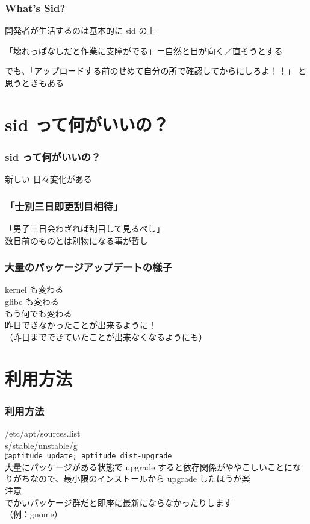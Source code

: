 \documentclass[cjk,dvipdfmx]{beamer}
\begin{document}
 \begin{frame}
  \frametitle{ What's Sid?}
 
 開発者が生活するのは基本的に sid の上
  
  「壊れっぱなしだと作業に支障がでる」＝自然と目が向く／直そうとする

 でも、「アップロードする前のせめて自分の所で確認してからにしろよ！！」
  と思うときもある
 \end{frame}
 
 \section{sid って何がいいの？}
 \begin{frame}
  \frametitle{sid って何がいいの？}

  新しい
  日々変化がある
 \end{frame}

 \begin{frame}
  \frametitle{「士別三日即更刮目相待」}
 「男子三日会わざれば刮目して見るべし」\\
  数日前のものとは別物になる事が暫し
 \end{frame}

 \begin{frame}
  
  \frametitle{大量のパッケージアップデートの様子}
  
 kernel も変わる\\
 glibc も変わる\\
 もう何でも変わる\\
 昨日できなかったことが出来るように！\\
  （昨日までできていたことが出来なくなるようにも）
 \end{frame}
 
 \section{利用方法}
 
 \begin{frame}
  \frametitle{利用方法}
  
  /etc/apt/sources.list\\
s/stable/unstable/g\\
  $\sharp$\texttt{aptitude update; aptitude dist-upgrade}\\
  大量にパッケージがある状態で upgrade すると依存関係がややこしいことになりがちなので、最小限のインストールから upgrade したほうが楽\\
  注意\\
  でかいパッケージ群だと即座に最新にならなかったりします\\
  （例：gnome）
 \end{frame}
 
\end{document}
